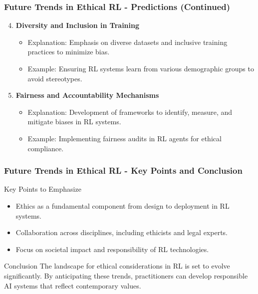 \documentclass{beamer}
\begin{document}
\begin{frame}[fragile]
    \frametitle{Future Trends in Ethical RL - Predictions (Continued)}
    \begin{enumerate}
        \setcounter{enumi}{3} %
        \item \textbf{Diversity and Inclusion in Training}
            \begin{itemize}
                \item Explanation: Emphasis on diverse datasets and inclusive training practices to minimize bias.
                \item Example: Ensuring RL systems learn from various demographic groups to avoid stereotypes.
            \end{itemize}

        \item \textbf{Fairness and Accountability Mechanisms}
            \begin{itemize}
                \item Explanation: Development of frameworks to identify, measure, and mitigate biases in RL systems.
                \item Example: Implementing fairness audits in RL agents for ethical compliance.
            \end{itemize}
    \end{enumerate}
\end{frame}

\begin{frame}[fragile]
    \frametitle{Future Trends in Ethical RL - Key Points and Conclusion}
    \begin{block}{Key Points to Emphasize}
        \begin{itemize}
            \item Ethics as a fundamental component from design to deployment in RL systems.
            \item Collaboration across disciplines, including ethicists and legal experts.
            \item Focus on societal impact and responsibility of RL technologies.
        \end{itemize}
    \end{block}

    \begin{block}{Conclusion}
        The landscape for ethical considerations in RL is set to evolve significantly. By anticipating these trends, practitioners can develop responsible AI systems that reflect contemporary values.
    \end{block}
\end{frame}
\end{document}
